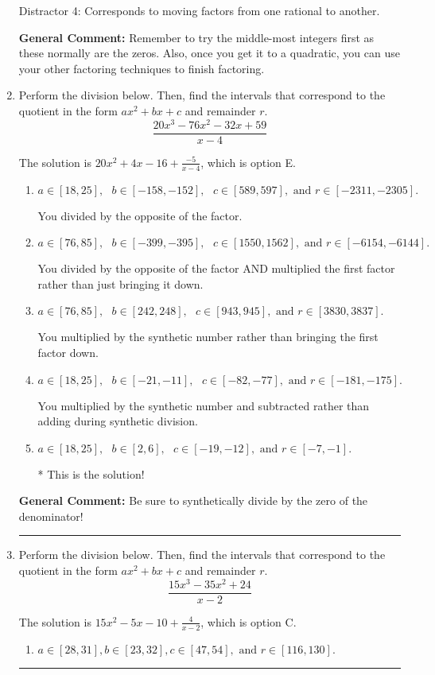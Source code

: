 \documentclass{extbook}[14pt]
\newcommand{\litem}[1]{\item #1

\rule{\textwidth}{0.4pt}}
\begin{document}
\begin{enumerate}
{\begin{enumerate}[label=\Alph*.]
 Distractor 4: Corresponds to moving factors from one rational to another.
\end{enumerate}

\textbf{General Comment:} Remember to try the middle-most integers first as these normally are the zeros. Also, once you get it to a quadratic, you can use your other factoring techniques to finish factoring.
}
\litem{
Perform the division below. Then, find the intervals that correspond to the quotient in the form $ax^2+bx+c$ and remainder $r$.
\[ \frac{20x^{3} -76 x^{2} -32 x + 59}{x -4} \]

The solution is \( 20x^{2} +4 x -16 + \frac{-5}{x -4} \), which is option E.\begin{enumerate}[label=\Alph*.]
\item \( a \in [18, 25], \text{   } b \in [-158, -152], \text{   } c \in [589, 597], \text{   and   } r \in [-2311, -2305]. \)

 You divided by the opposite of the factor.
\item \( a \in [76, 85], \text{   } b \in [-399, -395], \text{   } c \in [1550, 1562], \text{   and   } r \in [-6154, -6144]. \)

 You divided by the opposite of the factor AND multiplied the first factor rather than just bringing it down.
\item \( a \in [76, 85], \text{   } b \in [242, 248], \text{   } c \in [943, 945], \text{   and   } r \in [3830, 3837]. \)

 You multiplied by the synthetic number rather than bringing the first factor down.
\item \( a \in [18, 25], \text{   } b \in [-21, -11], \text{   } c \in [-82, -77], \text{   and   } r \in [-181, -175]. \)

 You multiplied by the synthetic number and subtracted rather than adding during synthetic division.
\item \( a \in [18, 25], \text{   } b \in [2, 6], \text{   } c \in [-19, -12], \text{   and   } r \in [-7, -1]. \)

* This is the solution!
\end{enumerate}

\textbf{General Comment:} Be sure to synthetically divide by the zero of the denominator!
}
\litem{
Perform the division below. Then, find the intervals that correspond to the quotient in the form $ax^2+bx+c$ and remainder $r$.
\[ \frac{15x^{3} -35 x^{2} + 24}{x -2} \]

The solution is \( 15x^{2} -5 x -10 + \frac{4}{x -2} \), which is option C.\begin{enumerate}[label=\Alph*.]
\item \( a \in [28, 31], b \in [23, 32], c \in [47, 54], \text{ and } r \in [116, 130]. \)


\end{enumerate}}
\end{enumerate}
\end{document}
